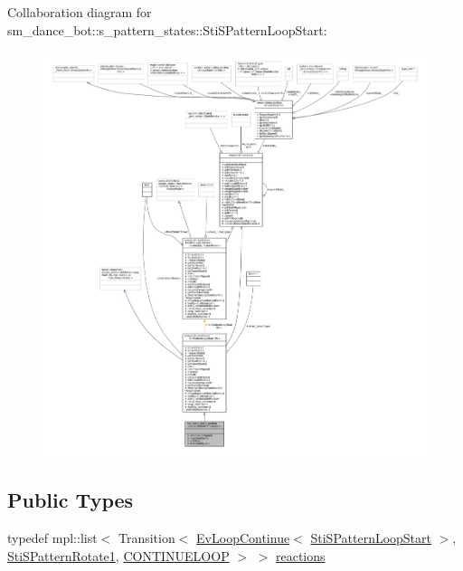 Collaboration diagram for sm\+\_\+dance\+\_\+bot\+:\+:s\+\_\+pattern\+\_\+states\+:\+:Sti\+S\+Pattern\+Loop\+Start\+:
\nopagebreak
\begin{figure}[H]
\begin{center}
\leavevmode
\includegraphics[width=350pt]{structsm__dance__bot_1_1s__pattern__states_1_1StiSPatternLoopStart__coll__graph}
\end{center}
\end{figure}
\subsection*{Public Types}
\begin{DoxyCompactItemize}
\item 
typedef mpl\+::list$<$ Transition$<$ \hyperlink{structsmacc_1_1default__events_1_1EvLoopContinue}{Ev\+Loop\+Continue}$<$ \hyperlink{structsm__dance__bot_1_1s__pattern__states_1_1StiSPatternLoopStart}{Sti\+S\+Pattern\+Loop\+Start} $>$, \hyperlink{structsm__dance__bot_1_1s__pattern__states_1_1StiSPatternRotate1}{Sti\+S\+Pattern\+Rotate1}, \hyperlink{structsmacc_1_1default__transition__tags_1_1CONTINUELOOP}{C\+O\+N\+T\+I\+N\+U\+E\+L\+O\+OP} $>$ $>$ \hyperlink{structsm__dance__bot_1_1s__pattern__states_1_1StiSPatternLoopStart_a3ea4b54d39b71c82916be6e636e59cca}{reactions}
\end{DoxyCompactItemize}
